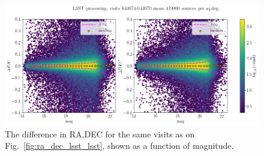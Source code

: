 \documentclass[DM,lsstdraft,toc,usenatbib]{lsstdoc}
\begin{document}
\begin{figure}
\begin{centering}
\includegraphics[width=1.0\columnwidth]{figs/644074-644070_dra_ddec_mag.png}
\caption{The difference in RA,DEC for the same visits as on Fig.~\ref{fig:ra_dec_lsst_lsst}, shown as a function of magnitude.}
\label{fig:ra_dec_mag}
\end{centering}
\end{figure} 
\end{document}
